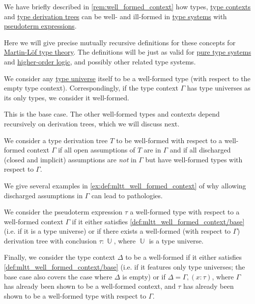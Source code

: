 \begin{definition}\label{def:mltt_well_formed_context}\mimprovised
  We have briefly described in \cref{rem:well_formed_context} how types, \hyperref[def:type_context]{type contexts} and \hyperref[def:type_derivation_tree]{type derivation trees} can be well- and ill-formed in \hyperref[def:abstract_type_system]{type systems} with \hyperref[con:pseudoterm_expression]{pseudoterm expressions}.

  Here we will give precise mutually recursive definitions for these concepts for \hyperref[def:martin_lof_type_theory]{Martin-L\"of type theory}. The definitions will be just as valid for \hyperref[def:pure_type_system]{pure type systems} and \hyperref[def:higher_order_logic]{higher-order logic}, and possibly other related type systems.

  \begin{thmenum}
     We consider any \hyperref[def:mltt_signature/universe]{type universe} itself to be a well-formed type (with respect to the empty type context). Correspondingly, if the type context \( \Gamma \) has type universes as its only types, we consider it well-formed.

    This is the base case. The other well-formed types and contexts depend recursively on derivation trees, which we will discuss next.

     We consider a type derivation tree \( T \) to be well-formed with respect to a well-formed context \( \Gamma \) if all open assumptions of \( T \) are in \( \Gamma \) and if all discharged (closed and implicit) assumptions are \emph{not} in \( \Gamma \) but have well-formed types with respect to \( \Gamma \).

    We give several examples in \cref{ex:def:mltt_well_formed_context} of why allowing discharged assumptions in \( \Gamma \) can lead to pathologies.

     We consider the pseudoterm expression \( \tau \) a well-formed type with respect to a well-formed context \( \Gamma \) if it either satisfies \cref{def:mltt_well_formed_context/base} (i.e. if it is a type universe) or if there exists a well-formed (with respect to \( \Gamma \)) derivation tree with conclusion \( \tau: \BbbU \), where \( \BbbU \) is a type universe.

     Finally, we consider the type context \( \Delta \) to be a well-formed if it either satisfies \cref{def:mltt_well_formed_context/base} (i.e. if it features only type universes; the base case also covers the case where \( \Delta \) is empty) or if \( \Delta = \Gamma, (x: \tau) \), where \( \Gamma \) has already been shown to be a well-formed context, and \( \tau \) has already been shown to be a well-formed type with respect to \( \Gamma \).
  \end{thmenum}
\end{definition}
